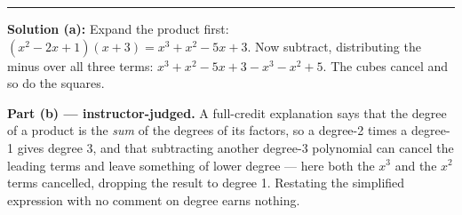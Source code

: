 \documentclass[12pt]{article}
\begin{document}
\vspace{0.15cm}
\noindent\rule{\linewidth}{0.2pt}


\textbf{Solution (a):} Expand the product first:
$(x^{2} - 2x + 1)(x + 3) = x^{3} + x^{2} - 5x + 3$. Now subtract, distributing
the minus over all three terms: $x^{3} + x^{2} - 5x + 3 - x^{3} - x^{2} + 5$.
The cubes cancel and so do the squares. 

\textbf{Part (b) --- instructor-judged.} A full-credit explanation says that the
degree of a product is the \emph{sum} of the degrees of its factors, so a
degree-2 times a degree-1 gives degree 3, and that subtracting another degree-3
polynomial can cancel the leading terms and leave something of lower degree ---
here both the $x^{3}$ and the $x^{2}$ terms cancelled, dropping the result to
degree 1. Restating the simplified expression with no comment on degree earns
nothing.
\end{document}
